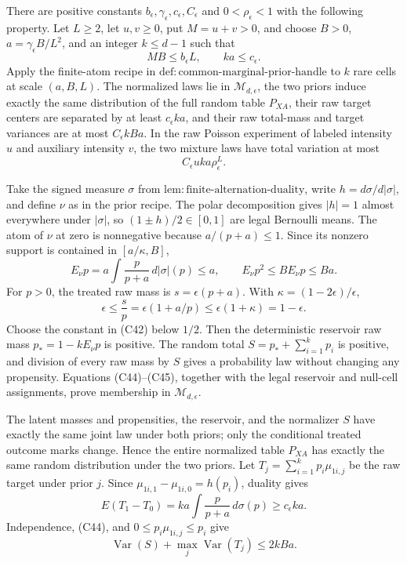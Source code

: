 There are positive constants \(b_\epsilon,\gamma_\epsilon,c_\epsilon,C_\epsilon\) and \(0<\rho_\epsilon<1\) with the following property.  Let \(L\ge2\), let \(u,v\ge0\), put \(M=u+v>0\), and choose \(B>0\), \(a=\gamma_\epsilon B/L^2\), and an integer \(k\le d-1\) such that
\[
 MB\le b_\epsilon L,\qquad ka\le c_\epsilon.                    \tag{C42}
\]
Apply the finite-atom recipe in \(\mathrm{def:common\mbox{-}marginal\mbox{-}prior\mbox{-}handle}\) to \(k\) rare cells at scale \((a,B,L)\).  The normalized laws lie in \(\mathcal M_{d,\epsilon}\), the two priors induce exactly the same distribution of the full random table \(P_{XA}\), their raw target centers are separated by at least \(c_\epsilon ka\), and their raw total-mass and target variances are at most \(C_\epsilon kBa\).  In the raw Poisson experiment of labeled intensity \(u\) and auxiliary intensity \(v\), the two mixture laws have total variation at most
\[
 C_\epsilon uka\rho_\epsilon^L.                                   \tag{C43}
\]

Take the signed measure \(\sigma\) from \(\mathrm{lem:finite\mbox{-}alternation\mbox{-}duality}\), write \(h=d\sigma/d|\sigma|\), and define \(\nu\) as in the prior recipe.  The polar decomposition gives \(|h|=1\) almost everywhere under \(|\sigma|\), so \((1\pm h)/2\in[0,1]\) are legal Bernoulli means.  The atom of \(\nu\) at zero is nonnegative because \(a/(p+a)\le1\).  Since its nonzero support is contained in \([a/\kappa,B]\),
\[
 E_\nu p=a\int\frac p{p+a}\,d|\sigma|(p)\le a,
 \qquad E_\nu p^2\le B E_\nu p\le Ba.                             \tag{C44}
\]
For \(p>0\), the treated raw mass is \(s=\epsilon(p+a)\).  With \(\kappa=(1-2\epsilon)/\epsilon\),
\[
 \epsilon\le\frac sp=\epsilon(1+a/p)
 \le\epsilon(1+\kappa)=1-\epsilon.                                \tag{C45}
\]
Choose the constant in (C42) below \(1/2\).  Then the deterministic reservoir raw mass \(p_*=1-kE_\nu p\) is positive.  The random total \(S=p_*+\sum_{i=1}^kp_i\) is positive, and division of every raw mass by \(S\) gives a probability law without changing any propensity.  Equations (C44)--(C45), together with the legal reservoir and null-cell assignments, prove membership in \(\mathcal M_{d,\epsilon}\).

The latent masses and propensities, the reservoir, and the normalizer \(S\) have exactly the same joint law under both priors; only the conditional treated outcome marks change.  Hence the entire normalized table \(P_{XA}\) has exactly the same random distribution under the two priors.  Let \(T_j=\sum_{i=1}^kp_i\mu_{1i,j}\) be the raw target under prior \(j\).  Since \(\mu_{1i,1}-\mu_{1i,0}=h(p_i)\), duality gives
\[
 E(T_1-T_0)=ka\int\frac p{p+a}\,d\sigma(p)\ge c_\epsilon ka.       \tag{C46}
\]
Independence, (C44), and \(0\le p_i\mu_{1i,j}\le p_i\) give
\[
 \operatorname{Var}(S)+\max_j\operatorname{Var}(T_j)
 \le2kBa.                                                          \tag{C47}
\]

